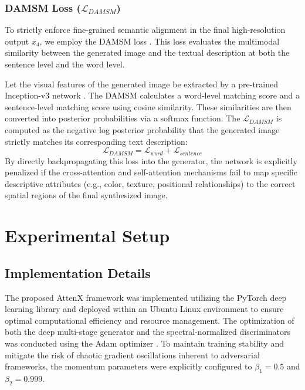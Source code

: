 \documentclass[conference]{IEEEtran}
\begin{document}
\subsubsection{DAMSM Loss ($\mathcal{L}_{DAMSM}$)}
To strictly enforce fine-grained semantic alignment in the final high-resolution output $x_4$, we employ the DAMSM loss \cite{xu2018attngan}. This loss evaluates the multimodal similarity between the generated image and the textual description at both the sentence level and the word level.

Let the visual features of the generated image be extracted by a pre-trained Inception-v3 network \cite{szegedy2016rethinking}. The DAMSM calculates a word-level matching score and a sentence-level matching score using cosine similarity. These similarities are then converted into posterior probabilities via a softmax function. The $\mathcal{L}_{DAMSM}$ is computed as the negative log posterior probability that the generated image strictly matches its corresponding text description:
\begin{equation}
    \mathcal{L}_{DAMSM} = \mathcal{L}_{word} + \mathcal{L}_{sentence}
\end{equation}
By directly backpropagating this loss into the generator, the network is explicitly penalized if the cross-attention and self-attention mechanisms fail to map specific descriptive attributes (e.g., color, texture, positional relationships) to the correct spatial regions of the final synthesized image.

\section{Experimental Setup}
\subsection{Implementation Details}

The proposed AttenX framework was implemented utilizing the PyTorch deep learning library \cite{paszke2019pytorch} and deployed within an Ubuntu Linux environment to ensure optimal computational efficiency and resource management. The optimization of both the deep multi-stage generator and the spectral-normalized discriminators was conducted using the Adam optimizer \cite{kingma2015adam}. To maintain training stability and mitigate the risk of chaotic gradient oscillations inherent to adversarial frameworks, the momentum parameters were explicitly configured to $\beta_1 = 0.5$ and $\beta_2 = 0.999$.
\end{document}
